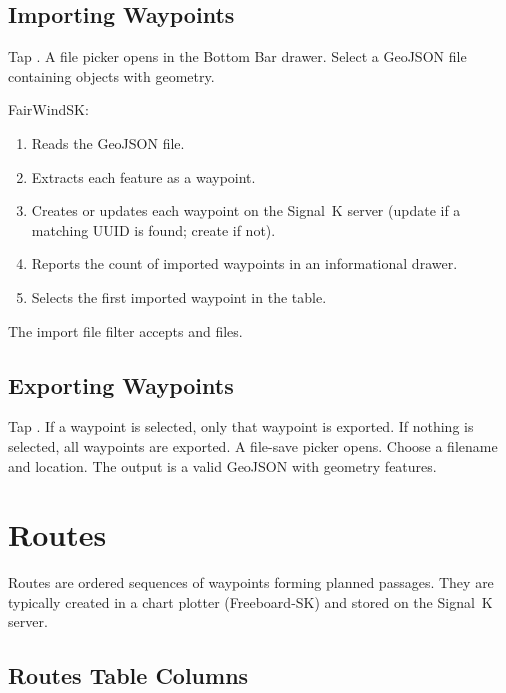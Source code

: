 \section{Importing Waypoints}

Tap . A file picker opens in the Bottom Bar drawer.
Select a GeoJSON file containing  objects with  geometry.

FairWindSK:
\begin{enumerate}
  \item Reads the GeoJSON file.
  \item Extracts each  feature as a waypoint.
  \item Creates or updates each waypoint on the Signal~K server (update if a matching UUID is found; create if not).
  \item Reports the count of imported waypoints in an informational drawer.
  \item Selects the first imported waypoint in the table.
\end{enumerate}

The import file filter accepts  and  files.

\section{Exporting Waypoints}

Tap . If a waypoint is selected, only that waypoint is exported.
If nothing is selected, all waypoints are exported.
A file-save picker opens. Choose a filename and location.
The output is a valid GeoJSON  with  geometry features.

\chapter{Routes}
\label{ch:routes}

Routes are ordered sequences of waypoints forming planned passages.
They are typically created in a chart plotter (Freeboard-SK) and stored on the Signal~K server.


\section{Routes Table Columns}

